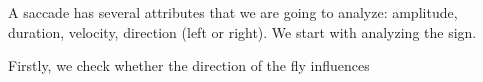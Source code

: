 A saccade has several attributes that we are going to analyze: amplitude, duration, velocity, direction (left or right). We start with analyzing the sign.

Firstly, we check whether the direction of the fly influences  